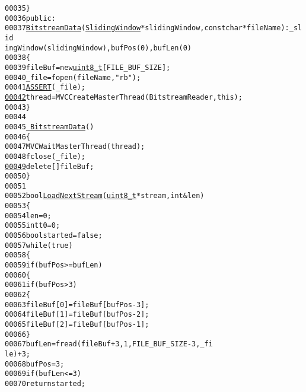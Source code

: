 \begin{footnotesize}
\begin{alltt}
00035         \}
00036 \textcolor{keyword}{public}:
00037         \hyperlink{class_bitstream_data_a0a84eec74369ca5b7754250b683aaaaa}{BitstreamData}(\hyperlink{class_sliding_window}{SlidingWindow} *slidingWindow, \textcolor{keyword}{const} \textcolor{keywordtype}{char} *fileName) : \_slid
      ingWindow(slidingWindow), bufPos(0), bufLen(0)
00038         \{
00039                 fileBuf = \textcolor{keyword}{new} \hyperlink{_types_8h_a363e4d606232036a6b89060813c45489}{uint8_t}[FILE\_BUF\_SIZE];
00040                 \_file = fopen(fileName, \textcolor{stringliteral}{"rb"});
00041                 \hyperlink{_debug_8h_a101586fab2b90a8adffe50a3550e235d}{ASSERT}(\_file);
\hypertarget{_bitstream_data_8h_source_l00042}{}\hyperlink{class_bitstream_data_a508c273c706e9ab418307d688f743b74}{00042}                 thread = MVCCreateMasterThread(BitstreamReader, \textcolor{keyword}{this});
00043         \}
00044 
00045         \hyperlink{class_bitstream_data_a508c273c706e9ab418307d688f743b74}{~BitstreamData}()
00046         \{
00047                 MVCWaitMasterThread(thread);
00048                 fclose(\_file);
\hypertarget{_bitstream_data_8h_source_l00049}{}\hyperlink{class_bitstream_data_a9475d45cccc6018ece6dec99caad1e58}{00049}                 \textcolor{keyword}{delete}[] fileBuf;
00050         \}
00051 
00052         \textcolor{keywordtype}{bool} \hyperlink{class_bitstream_data_a9475d45cccc6018ece6dec99caad1e58}{LoadNextStream}(\hyperlink{_types_8h_a363e4d606232036a6b89060813c45489}{uint8_t} *stream, \textcolor{keywordtype}{int} &len)
00053         \{
00054                 len = 0;
00055                 \textcolor{keywordtype}{int} t0 = 0;
00056                 \textcolor{keywordtype}{bool} started = \textcolor{keyword}{false};
00057                 \textcolor{keywordflow}{while} (\textcolor{keyword}{true})
00058                 \{
00059                         \textcolor{keywordflow}{if} (bufPos >= bufLen)
00060                         \{
00061                                 \textcolor{keywordflow}{if} (bufPos>3)
00062                                 \{
00063                                         fileBuf[0] = fileBuf[bufPos-3];
00064                                         fileBuf[1] = fileBuf[bufPos-2];
00065                                         fileBuf[2] = fileBuf[bufPos-1];
00066                                 \}
00067                                 bufLen = fread(fileBuf+3, 1, FILE\_BUF\_SIZE-3, \_fi
      le) + 3;
00068                                 bufPos = 3;
00069                                 \textcolor{keywordflow}{if} (bufLen <= 3)
00070                                         \textcolor{keywordflow}{return} started;

\end{alltt}
\end{footnotesize}

